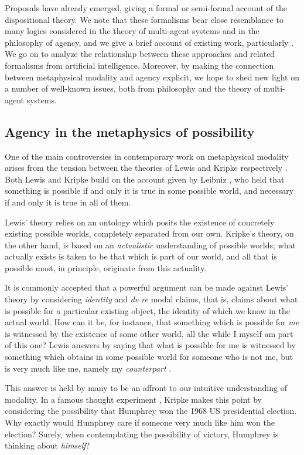 \documentclass{article}
\begin{document}
Proposals have already emerged, giving a formal or semi-formal account of the dispositional theory. We note that these formalisms bear close resemblance to many logics considered in the theory of multi-agent systems and in the philosophy of agency, and we give a brief account of existing work, particularly \cite{powmod,PhDpos}. We go on to analyze the relationship between these approaches and related formalisms from artificial intelligence. Moreover, by making the connection between metaphysical modality and agency explicit, we hope to shed new light on a number of well-known issues, both from philosophy and the theory of multi-agent systems.

\subsection*{Agency in the metaphysics of possibility}

One of the main controversies in contemporary work on metaphysical modality arises from the tension between the theories of Lewis and Kripke respectively \cite{KripkeNN,KripkeIN,LewisPW,LewisCPB}. Both Lewis and Kripke build on the account given by Leibniz \cite{Theodicy}, who held that something is possible if and only it is true in some possible world, and necessary if and only it is true in all of them.

Lewis' theory relies on an ontology which posits the existence of concretely existing possible worlds, completely separated from our own. Kripke's theory, on the other hand, is based on an \emph{actualistic} understanding of possible worlds; what actually exists is taken to be that which is part of our world, and all that is possible must, in principle, originate from this actuality.

It is commonly accepted that a powerful argument can be made against Lewis' theory by considering \emph{identity} and \emph{de re} modal claims, that is, claims about what is possible for a particular existing object, the identity of which we know in the actual world. How can it be, for instance, that something which is possible for \emph{me} is witnessed by the existence of some other world, all the while I myself am part of this one? Lewis answers by saying that what is possible for me is witnessed by something which obtains in some possible world for someone who is not me, but is very much like me, namely my \emph{counterpart} \cite{LewisCPB}. 

This answer is held by many to be an affront to our intuitive understanding of modality. In a famous thought experiment \cite{KripkeNN}, Kripke makes this point by considering the possibility that Humphrey won the 1968 US presidential election. Why exactly would Humphrey care if someone very much like him won the election? Surely, when contemplating the possibility of victory, Humphrey is thinking about \emph{himself}?
\end{document}
